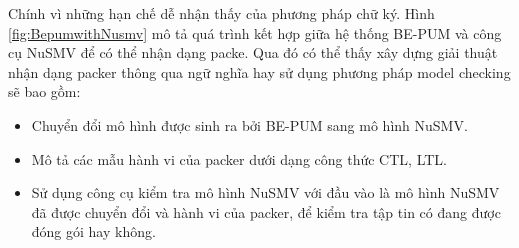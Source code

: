 \hspace{0.5cm}Chính vì những hạn chế dễ nhận thấy của phương pháp chữ ký. Hình \ref {fig:BepumwithNusmv} mô tả quá trình kết hợp giữa hệ thống BE-PUM và công cụ NuSMV để có thể nhận dạng packe. Qua đó có thể thấy xây dựng giải thuật nhận dạng packer thông qua ngữ nghĩa hay sử dụng phương pháp model checking sẽ bao gồm:

\begin{itemize}
\item{Chuyển đổi mô hình được sinh ra bởi BE-PUM sang mô hình NuSMV.\\}
\item{Mô tả các mẫu hành vi của packer dưới dạng công thức CTL, LTL.\\}
\item{Sử dụng công cụ kiểm tra mô hình NuSMV với đầu vào là mô hình NuSMV đã được chuyển đổi và hành vi của packer, để kiểm tra tập tin có đang được đóng gói hay không.}
\end{itemize} 

